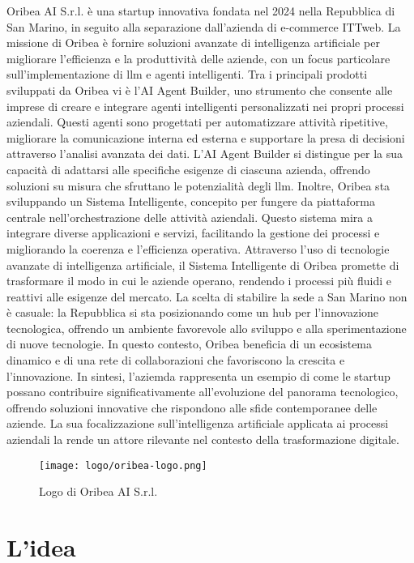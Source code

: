 Oribea AI S.r.l. è una startup innovativa fondata nel 2024 nella Repubblica di San Marino, in seguito alla separazione dall'azienda di e-commerce ITTweb. La missione di Oribea è fornire soluzioni avanzate di intelligenza artificiale per migliorare l'efficienza e la produttività delle aziende, con un focus particolare sull'implementazione di \gls{llm}\glsfirstoccur{} e agenti intelligenti.
Tra i principali prodotti sviluppati da Oribea vi è l'AI Agent Builder, uno strumento che consente alle imprese di creare e integrare agenti intelligenti personalizzati nei propri processi aziendali. Questi agenti sono progettati per automatizzare attività ripetitive, migliorare la comunicazione interna ed esterna e supportare la presa di decisioni attraverso l'analisi avanzata dei dati. L'AI Agent Builder si distingue per la sua capacità di adattarsi alle specifiche esigenze di ciascuna azienda, offrendo soluzioni su misura che sfruttano le potenzialità degli \gls{llm}.
Inoltre, Oribea sta sviluppando un Sistema Intelligente, concepito per fungere da piattaforma centrale nell'orchestrazione delle attività aziendali. Questo sistema mira a integrare diverse applicazioni e servizi, facilitando la gestione dei processi e migliorando la coerenza e l'efficienza operativa. Attraverso l'uso di tecnologie avanzate di intelligenza artificiale, il Sistema Intelligente di Oribea promette di trasformare il modo in cui le aziende operano, rendendo i processi più fluidi e reattivi alle esigenze del mercato.
La scelta di stabilire la sede a San Marino non è casuale: la Repubblica si sta posizionando come un hub per l'innovazione tecnologica, offrendo un ambiente favorevole allo sviluppo e alla sperimentazione di nuove tecnologie. In questo contesto, Oribea beneficia di un ecosistema dinamico e di una rete di collaborazioni che favoriscono la crescita e l'innovazione.
In sintesi, l'aziemda rappresenta un esempio di come le startup possano contribuire significativamente all'evoluzione del panorama tecnologico, offrendo soluzioni innovative che rispondono alle sfide contemporanee delle aziende. La sua focalizzazione sull'intelligenza artificiale applicata ai processi aziendali la rende un attore rilevante nel contesto della trasformazione digitale.

\begin{figure}
    \centering
    \texttt{[image: logo/oribea-logo.png]}
    \caption{Logo di Oribea AI S.r.l.}
    \label{fig:oribea-logo}
\end{figure}

\section{L'idea}

